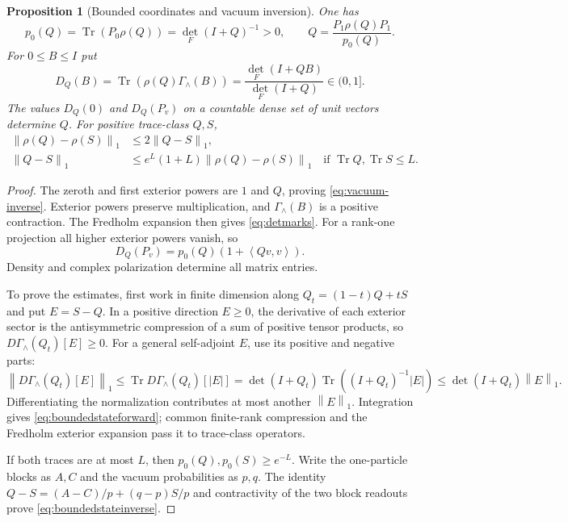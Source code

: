 \documentclass[11pt,a4paper]{amsart}
\numberwithin{equation}{section}
\newtheorem{proposition}[theorem]{Proposition}
\theoremstyle{definition}
\theoremstyle{remark}
\DeclareMathOperator{\Tr}{Tr}
\newcommand{\norm}[1]{\left\lVert#1\right\rVert}
\newcommand{\ip}[2]{\left\langle#1,#2\right\rangle}
\begin{document}
\begin{proposition}[Bounded coordinates and vacuum inversion]\label{prop:boundedmarks}
One has
\begin{equation}\label{eq:vacuum-inverse}
 p_0(Q)=\Tr(P_0\rho(Q))=\det_F(I+Q)^{-1}>0,\qquad
 Q=\frac{P_1\rho(Q)P_1}{p_0(Q)}.
\end{equation}
For $0\le B\le I$ put
\begin{equation}\label{eq:detmarks}
 D_Q(B)=\Tr(\rho(Q)\Gamma_\wedge(B))
       =\frac{\det_F(I+QB)}{\det_F(I+Q)}\in(0,1].
\end{equation}
The values $D_Q(0)$ and $D_Q(P_v)$ on a countable dense set of unit vectors determine $Q$. For positive trace-class $Q,S$,
\begin{align}
 \norm{\rho(Q)-\rho(S)}_1&\le2\norm{Q-S}_1,\label{eq:boundedstateforward}\\
 \norm{Q-S}_1&\le e^L(1+L)\norm{\rho(Q)-\rho(S)}_1
 \quad\text{if }\Tr Q,\Tr S\le L.\label{eq:boundedstateinverse}
\end{align}
\end{proposition}
\begin{proof}
The zeroth and first exterior powers are $1$ and $Q$, proving \eqref{eq:vacuum-inverse}. Exterior powers preserve multiplication, and $\Gamma_\wedge(B)$ is a positive contraction. The Fredholm expansion then gives \eqref{eq:detmarks}. For a rank-one projection all higher exterior powers vanish, so
\[
 D_Q(P_v)=p_0(Q)(1+\ip{Qv}{v}).
\]
Density and complex polarization determine all matrix entries.

To prove the estimates, first work in finite dimension along $Q_t=(1-t)Q+tS$ and put $E=S-Q$. In a positive direction $E\ge0$, the derivative of each exterior sector is the antisymmetric compression of a sum of positive tensor products, so $D\Gamma_\wedge(Q_t)[E]\ge0$. For a general self-adjoint $E$, use its positive and negative parts:
\[
 \norm{D\Gamma_\wedge(Q_t)[E]}_1
 \le\Tr D\Gamma_\wedge(Q_t)[|E|]
 =\det(I+Q_t)\Tr((I+Q_t)^{-1}|E|)
 \le\det(I+Q_t)\norm E_1.
\]
Differentiating the normalization contributes at most another $\norm E_1$. Integration gives \eqref{eq:boundedstateforward}; common finite-rank compression and the Fredholm exterior expansion pass it to trace-class operators.

If both traces are at most $L$, then $p_0(Q),p_0(S)\ge e^{-L}$. Write the one-particle blocks as $A,C$ and the vacuum probabilities as $p,q$. The identity
$Q-S=(A-C)/p+(q-p)S/p$
and contractivity of the two block readouts prove \eqref{eq:boundedstateinverse}.
\end{proof}
\end{document}
